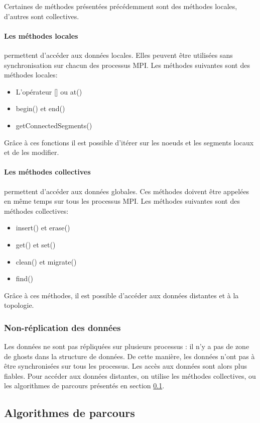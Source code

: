 Certaines de méthodes présentées précédemment sont des méthodes locales, d'autres sont collectives.

\paragraph{Les méthodes locales} permettent d'accéder aux données locales. Elles peuvent être utilisées sans synchronisation sur chacun des processus MPI. Les méthodes suivantes sont des méthodes locales:
\begin{itemize}
	\item L'opérateur [] ou at()
	\item begin() et end()
	\item getConnectedSegments()
\end{itemize}
Grâce à ces fonctions il est possible d'itérer sur les noeuds et les segments locaux et de les modifier.


\paragraph{Les méthodes collectives} permettent d'accéder aux données globales. Ces méthodes doivent être appelées en même temps sur tous les processus MPI. Les méthodes suivantes sont des méthodes collectives:
\begin{itemize}
	\item insert() et erase()
	\item get() et set()
	\item clean() et migrate()
	\item find()
\end{itemize}
Grâce à ces méthodes, il est possible d'accéder aux données distantes et à la topologie.

\subsubsection{Non-réplication des données}

Les données ne sont pas répliquées sur plusieurs processus : il n'y a pas de zone de ghosts dans la structure de données. De cette manière, les données n'ont pas à être synchronisées sur tous les processus. Les accès aux données sont alors plus fiables. Pour accéder aux données distantes, on utilise les méthodes collectives, ou les algorithmes de parcours présentés en section \ref{sec:TAD-algos_parcours}.

\subsection{Algorithmes de parcours}
\label{sec:TAD-algos_parcours}

